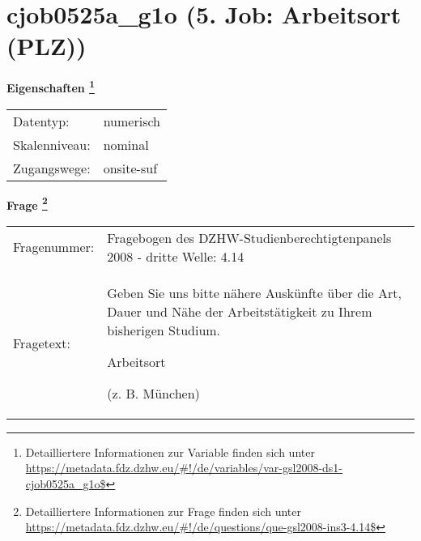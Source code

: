 
    \setcounter{footnote}{0}

    \vspace*{-1.8cm}
	\section{cjob0525a\_g1o (5. Job: Arbeitsort (PLZ))}
	\label{section:cjob0525a_g1o}



    \vspace*{0.5cm}
    \noindent\textbf{Eigenschaften
	\footnote{Detailliertere Informationen zur Variable finden sich unter
		\url{https://metadata.fdz.dzhw.eu/\#!/de/variables/var-gsl2008-ds1-cjob0525a_g1o$}}}\\
	\begin{tabularx}{\hsize}{@{}lX}
	Datentyp: & numerisch \\
	Skalenniveau: & nominal \\
	Zugangswege: &
	  onsite-suf
 \\
    \end{tabularx}



				\vspace*{0.5cm}
                \noindent\textbf{Frage
	                \footnote{Detailliertere Informationen zur Frage finden sich unter
		              \url{https://metadata.fdz.dzhw.eu/\#!/de/questions/que-gsl2008-ins3-4.14$}}}\\
				\begin{tabularx}{\hsize}{@{}lX}
					Fragenummer: &
					  Fragebogen des DZHW-Studienberechtigtenpanels 2008 - dritte Welle:
					  4.14
 \\
					Fragetext: & Geben Sie uns bitte nähere Auskünfte über die Art, Dauer und Nähe der Arbeitstätigkeit zu Ihrem bisherigen Studium.\par  Arbeitsort\par  (z. B. München) \\
				\end{tabularx}





